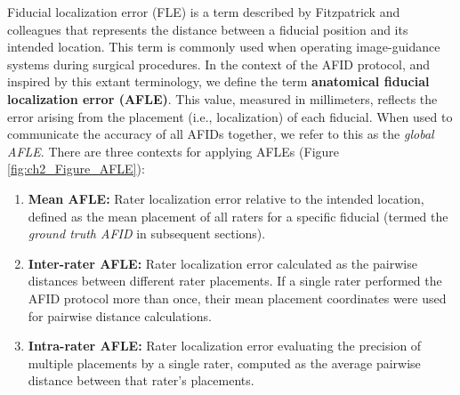 \newpage
Fiducial localization error (FLE) is a term described by Fitzpatrick and colleagues\cite{Fitzpatrick1998-hp} that represents the distance between a fiducial position and its intended location. This term is commonly used when operating image-guidance systems during surgical procedures. In the context of the AFID protocol, and inspired by this extant terminology, we define the term \textbf{anatomical fiducial localization error (AFLE)}. This value, measured in millimeters, reflects the error arising from the placement (i.e., localization) of each fiducial. When used to communicate the accuracy of all AFIDs together, we refer to this as the \emph{global AFLE}. There are three contexts for applying AFLEs (Figure \ref{fig:ch2_Figure_AFLE}):
\begin{enumerate}
    \item \textbf{Mean AFLE:} Rater localization error relative to the intended location, defined as the mean placement of all raters for a specific fiducial (termed the \emph{ground truth AFID} in subsequent sections).
    \item \textbf{Inter-rater AFLE:} Rater localization error calculated as the pairwise distances between different rater placements. If a single rater performed the AFID protocol more than once, their mean placement coordinates were used for pairwise distance calculations.
    \item \textbf{Intra-rater AFLE:} Rater localization error evaluating the precision of multiple placements by a single rater, computed as the average pairwise distance between that rater’s placements.
\end{enumerate}

